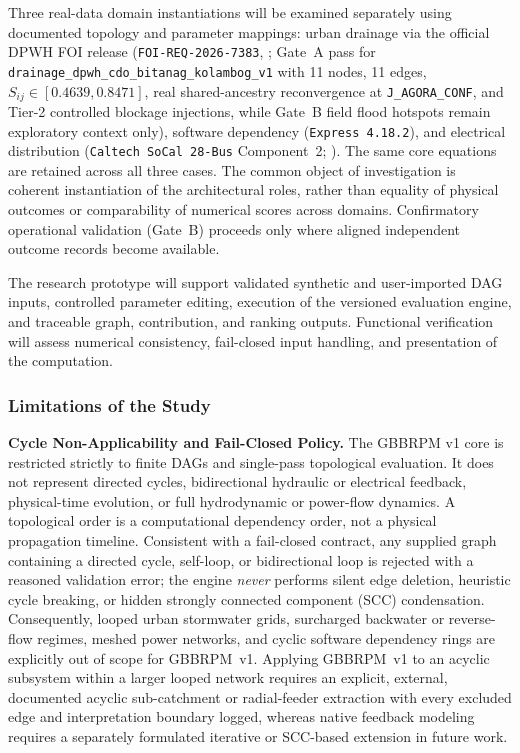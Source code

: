 Three real-data domain instantiations will be examined separately using
documented topology and parameter mappings: urban drainage via the official
DPWH FOI release (\texttt{FOI-REQ-2026-7383}, \citealp{dpwh2026foi,upplanades2016};
Gate~A pass for \texttt{drainage\_\allowbreak dpwh\_\allowbreak cdo\_\allowbreak bitanag\_\allowbreak kolambog\_\allowbreak v1} with 11
nodes, 11 edges, $S_{ij} \in [0.4639, 0.8471]$, real shared-ancestry
reconvergence at \texttt{J\_AGORA\_CONF}, and Tier-2 controlled blockage
injections, while Gate~B field flood hotspots remain exploratory context
only), software dependency (\texttt{Express 4.18.2}), and electrical
distribution (\texttt{Caltech SoCal 28-Bus} Component~2; \citealp{xie2025}).
The same core equations are retained across all three cases. The common
object of investigation is coherent instantiation of the architectural roles,
rather than equality of physical outcomes or comparability of numerical
scores across domains. Confirmatory operational validation (Gate~B) proceeds
only where aligned independent outcome records become available.

The research prototype will support validated synthetic and user-imported
DAG inputs, controlled parameter editing, execution of the versioned
evaluation engine, and traceable graph, contribution, and ranking outputs.
Functional verification will assess numerical consistency, fail-closed input
handling, and presentation of the computation.

\subsubsection{Limitations of the Study}

\textbf{Cycle Non-Applicability and Fail-Closed Policy.} The GBBRPM v1 core
is restricted strictly to finite DAGs and single-pass topological evaluation.
It does not represent directed cycles, bidirectional hydraulic or electrical
feedback, physical-time evolution, or full hydrodynamic or power-flow
dynamics. A topological order is a computational dependency order, not a
physical propagation timeline. Consistent with a fail-closed contract, any
supplied graph containing a directed cycle, self-loop, or bidirectional loop
is rejected with a reasoned validation error; the engine \emph{never}
performs silent edge deletion, heuristic cycle breaking, or hidden strongly
connected component (SCC) condensation. Consequently, looped urban stormwater
grids, surcharged backwater or reverse-flow regimes, meshed power networks,
and cyclic software dependency rings are explicitly out of scope for
GBBRPM~v1. Applying GBBRPM~v1 to an acyclic subsystem within a larger looped
network requires an explicit, external, documented acyclic sub-catchment or
radial-feeder extraction with every excluded edge and interpretation boundary
logged, whereas native feedback modeling requires a separately formulated
iterative or SCC-based extension in future work.

